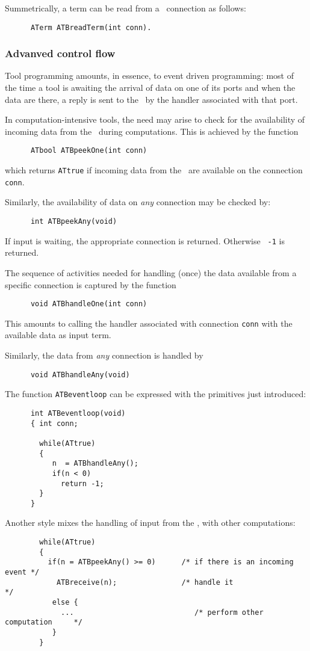 \documentclass[a4,twoside,noweb]{article} %
\begin{document}
Summetrically, a term can be read from a \TB\ connection as follows:
\begin{verbatim}
      ATerm ATBreadTerm(int conn).
\end{verbatim}

\subsubsection{\label{AdvancedControl}Advanved control flow}

Tool programming amounts, in essence, to event driven programming: most of the time
a tool is awaiting the arrival of data on one of its
ports and when the data are there, a reply is sent to the \TB\ by the
handler associated with that port.

In computation-intensive tools, the need may arise to
check for the availability of incoming data from the \TB\ during
computations. This is achieved by the function
\begin{verbatim}
      ATbool ATBpeekOne(int conn)
\end{verbatim}
which returns {\tt ATtrue} if incoming data from the \TB\ are available
on the connection {\tt conn}.

Similarly, the availability of data on \emph{any} connection may be checked
by:
\begin{verbatim}
      int ATBpeekAny(void)
\end{verbatim}
If input is waiting, the appropriate connection is returned. Otherwise {\tt
  -1} is returned.

The sequence of activities needed for handling (once) the data available from
a specific connection is captured by the function
\begin{verbatim}
      void ATBhandleOne(int conn)
\end{verbatim}
This amounts to calling the handler associated with connection {\tt conn}
with the available data as input term.

Similarly, the data from \emph{any} connection is handled by
\begin{verbatim}
      void ATBhandleAny(void)
\end{verbatim}

The function {\tt ATBeventloop} can be expressed with the primitives just
introduced:

\begin{verbatim}
      int ATBeventloop(void)
      { int conn;

        while(ATtrue)
        {
           n  = ATBhandleAny();
           if(n < 0)
             return -1;
        }
      }
\end{verbatim}
Another style mixes the handling of input from the \TB, with other
computations:
\begin{verbatim}
        while(ATtrue)
        { 
          if(n = ATBpeekAny() >= 0)      /* if there is an incoming event */
            ATBreceive(n);               /* handle it                     */
           else {
             ...                            /* perform other computation     */
           }
        }
\end{verbatim}
\end{document}
